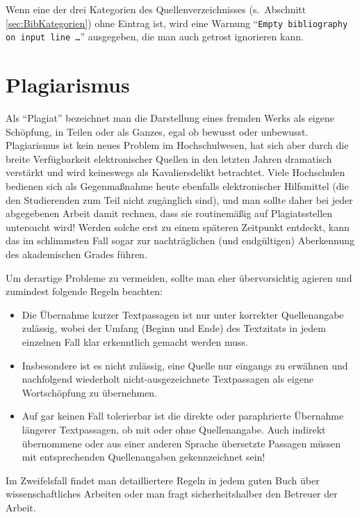 Wenn eine der drei Kategorien des Quellenverzeichnisses (s.~Abschnitt \ref{sec:BibKategorien})
ohne Eintrag ist, wird eine Warnung "`\texttt{Empty bibliography on input line \ldots}"' ausgegeben, die man auch getrost ignorieren kann.




\section{Plagiarismus}
\label{sec:Plagiarismus}

Als "`Plagiat"' bezeichnet man die Darstellung eines fremden Werks als eigene Schöpfung, 
in Teilen oder als Ganzes, egal ob bewusst oder unbewusst.
Plagiarismus ist kein neues Problem im Hochschulwesen, hat sich aber durch die 
breite Verfügbarkeit elektronischer Quellen in den letzten Jahren dramatisch 
verstärkt und wird keineswegs als Kavaliersdelikt betrachtet.
Viele Hochschulen bedienen sich als Gegenmaßnahme heute ebenfalls elektronischer Hilfsmittel 
(die den Studierenden zum Teil nicht zugänglich sind), und man sollte daher bei jeder 
abgegebenen Arbeit damit rechnen, dass sie routinemäßig auf Plagiatsstellen untersucht wird!
Werden solche erst zu einem späteren Zeitpunkt entdeckt, kann das im schlimmsten Fall sogar 
zur nachträglichen (und endgültigen) Aberkennung des akademischen Grades führen.

Um derartige Probleme zu vermeiden, sollte man eher übervorsichtig agieren und zumindest folgende Regeln beachten:
%
\begin{itemize}
\item
Die Übernahme kurzer Textpassagen ist nur unter korrekter Quellenangabe zulässig, wobei der Umfang (Beginn und Ende) des Textzitats in jedem einzelnen Fall klar erkenntlich gemacht werden muss. 
\item
Insbesondere ist es nicht zulässig, eine Quelle nur eingangs zu erwähnen und nachfolgend wiederholt nicht-ausgezeichnete Textpassagen als eigene Wortschöpfung zu übernehmen. 
\item
Auf gar keinen Fall tolerierbar ist die direkte oder paraphrierte Übernahme längerer Textpassagen, ob mit oder ohne Quellenangabe. Auch indirekt übernommene oder aus einer anderen Sprache übersetzte Passagen müssen mit entsprechenden Quellenangaben gekennzeichnet sein! 
\end{itemize}
%
Im Zweifelsfall findet man detailliertere Regeln in jedem guten Buch über wissenschaftliches Arbeiten oder man fragt sicherheitshalber den Betreuer der Arbeit.


